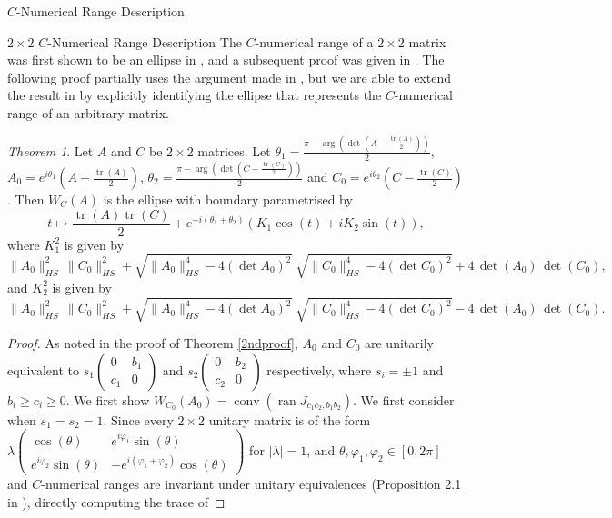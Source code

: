 \documentclass[12pt]{article}
\theoremstyle{plain}
\theoremstyle{definition}
\theoremstyle{remark}
\renewcommand{\phi}{\varphi}
\newcommand{\ran}{\operatorname{ran}}
\newtheorem{Theorem}{Theorem}[section]
\numberwithin{equation}{section}
\begin{document}
\begin{section}{$C$-Numerical Range Description}
\begin{subsection}{$2 \times 2$ $C$-Numerical Range Description}
The $C$-numerical range of a $2 \times 2$ matrix was first shown to be an ellipse in \cite{nakazato1994c}, and a subsequent proof was given in \cite{kwong1996some}. The following proof partially uses the argument made in \cite{kwong1996some}, but we are able to extend the result in \cite{kwong1996some} by explicitly identifying the ellipse that represents the $C$-numerical range of an arbitrary matrix.
\begin{Theorem}
    Let $A$ and $C$ be $2 \times 2$ matrices. Let $\theta_1 = \frac{\pi - \operatorname{arg}(\det (A - \frac{\operatorname{tr}(A)}{2}))}{2} $, $A_0 = e^{i \theta_1}(A - \frac{\operatorname{tr}(A)}{2})$, $\theta_2 = \frac{\pi - \operatorname{arg}(\det (C - \frac{\operatorname{tr}(C)}{2}))}{2} $ and $C_0 = e^{i \theta_2}(C - \frac{\operatorname{tr}(C)}{2})$. Then $W_C(A)$ is the ellipse with boundary parametrised by
    \begin{equation}\label{1stC}
    t \mapsto  \frac{\operatorname{tr}(A) \operatorname{tr}(C)}{2} + e^{-i(\theta_1 +  \theta_2)}(K_1  \cos (t) + i K_2 \sin (t)),
    \end{equation}
    where $K_1^2$ is given by
$$
        \|A_0\|_{HS}^2\,\|C_0\|_{HS}^2
+\sqrt{\|A_0\|_{HS}^4-4(\det A_0)^2}\;
 \sqrt{\|C_0\|_{HS}^4-4(\det C_0)^2}
+4\,\det(A_0)\,\det(C_0),
$$
and $K_2^2$ is given by
$$ \|A_0\|_{HS}^2\,\|C_0\|_{HS}^2
+\sqrt{\|A_0\|_{HS}^4-4(\det A_0)^2}\;
 \sqrt{\|C_0\|_{HS}^4-4(\det C_0)^2}
-4\,\det(A_0)\,\det(C_0).
$$
\end{Theorem}
\begin{proof}
As noted in the proof of Theorem \ref{2ndproof}, $A_0$ and $C_0$ are unitarily equivalent to $s_1\begin{pmatrix}
    0 & b_1 \\
    c_1 & 0
\end{pmatrix}$ and $s_2\begin{pmatrix}
    0 & b_2 \\
    c_2 & 0
\end{pmatrix}$ respectively, where $s_i = \pm 1$ and $b_i \geq c_i \geq 0$. We first show $W_{C_0}(A_0) = \operatorname{conv}(\ran J_{c_1c_2, b_1b_2})$. We first consider when $s_1 = s_2 =1$. Since every $ 2 \times 2$ unitary matrix is of the form $\lambda \begin{pmatrix}
    \cos (\theta) & e^{i \phi_1} \sin (\theta) \\
    e^{i \phi_2} \sin (\theta) & -e^{i (\phi_1+ \phi_2)} \cos (\theta)
\end{pmatrix}$ for $|\lambda| =  1$, and $\theta, \phi_1, \phi_2 \in [0, 2 \pi]$ and $C$-numerical ranges are invariant under unitary equivalences (Proposition 2.1 in \cite{gau2021numerical}), directly computing the trace of

\end{proof}
\end{subsection}
\end{section}
\end{document}
